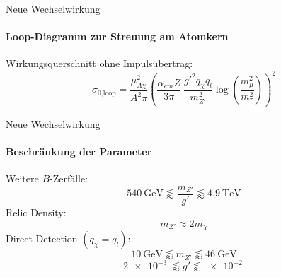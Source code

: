 \begin{frame}{Neue Wechselwirkung}
\framesubtitle{Loop-Diagramm zur Streuung am Atomkern}
\begin{minipage}{.25\textwidth}
		\resizebox{1.4\textwidth}{!}{
			
		}
\end{minipage}
\hfill
\begin{minipage}{.7\textwidth}
	Wirkungsquerschnitt ohne Impulsübertrag:
	\[ \sigma_\text{0,loop} = \frac{\mu_{A\chi}^2}{A^2\pi}\left(\frac{\alpha_{em}Z}{3\pi}\ \frac{g'^2q_\chi q_l}{m_{Z'}^2}\log\left(\frac{m_\mu^2}{m_\tau^2}\right)\right)^2 \]
\end{minipage}
\end{frame}


\begin{frame}{Neue Wechselwirkung}
\framesubtitle{Beschränkung der Parameter}
Weitere $B$-Zerfälle:
\[ \SI{540}{\giga\electronvolt}\lessapprox\frac{m_{Z'}}{g'}\lessapprox\SI{4.9}{\tera\electronvolt} \]
Relic Density:
	\[ m_{Z'}\approx 2m_\chi \]
Direct Detection $(q_\chi=q_l)$:
	\[ \SI{10}{\giga\electronvolt}\lessapprox m_{Z'} \lessapprox\SI{46}{\giga\electronvolt} \]
	\[ \SI{2e-3}{}\lessapprox g' \lessapprox\SI{e-2}{} \]
\end{frame}